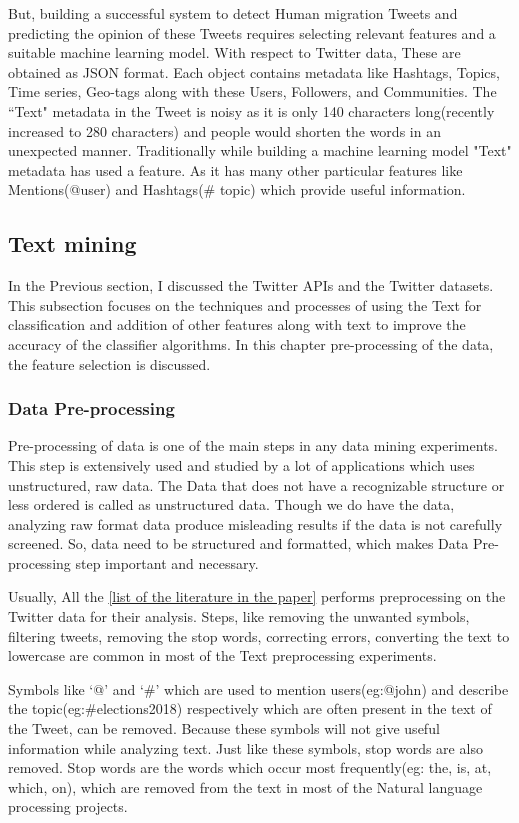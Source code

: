  But, building a successful system to detect Human migration Tweets and predicting the opinion of these Tweets requires selecting relevant features and a suitable machine learning model. With respect to Twitter data, These are obtained as JSON format. Each object contains metadata like Hashtags, Topics, Time series, Geo-tags along with these Users, Followers, and Communities. The ``Text" metadata in the Tweet is noisy as it is only 140 characters long(recently increased to 280 characters) and people would shorten the words in an unexpected manner. Traditionally while building a machine learning model "Text" metadata has used a feature. As it has many other particular features like Mentions(@user) and Hashtags(\# topic) which provide useful information.
 
 
\subsection{Text mining}

In the Previous section, I discussed the Twitter APIs and the Twitter datasets. This subsection focuses on the techniques and processes of using the Text for classification and addition of other features along with text to improve the accuracy of the classifier algorithms.  In this chapter pre-processing of the data, the feature selection is discussed.

\subsubsection{Data Pre-processing}

Pre-processing of data is one of the main steps in any data mining experiments. This step is extensively used and studied by a lot of applications which uses unstructured, raw data. The Data that does not have a recognizable structure or less ordered is called as unstructured data.  Though we do have the data, analyzing raw format data produce misleading results if the data is not carefully screened. So, data need to be structured and formatted, which makes Data Pre-processing step important and necessary.

Usually, All the \underline{[list of the literature in the paper]} performs preprocessing on the Twitter data for their analysis. Steps,  like removing the unwanted symbols, filtering tweets, removing the stop words,  correcting errors, converting the text to lowercase are common in most of the Text preprocessing experiments.

Symbols like `@' and `\#' which are used to mention users(eg:@john) and describe the topic(eg:\#elections2018) respectively which are often present in the text of the Tweet, can be removed. Because these symbols will not give useful information while analyzing text. Just like these symbols, stop words are also removed. Stop words are the words which occur most frequently(eg: the, is, at, which, on), which are removed from the text in most of the Natural language processing projects. 

